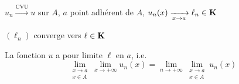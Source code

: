 \begin{thm}
    \Hyp $u_n \xrightarrow[]{\text{CVU}} u$ sur $A$,  $a$ point adhérent de  $A$,  $u_n(x) \xrightarrow[x\to a]{}\ell _n \in  \mathbf K$
    \begin{concenum}
    \item $(\ell _n)$ converge vers $\ell  \in \mathbf K$
    \item La fonction $u$ a pour limite  $\ell $ en $a$, i.e.  \[
            \lim_{\substack{x \to  a\\x \in  A}} \lim_{x \to  +\infty} u_n(x)=\lim_{n \to  +\infty}\lim_{\substack{x \to  a\\ x \in  A}} u_n(x)
    \] 
    \end{concenum}
\end{thm}

